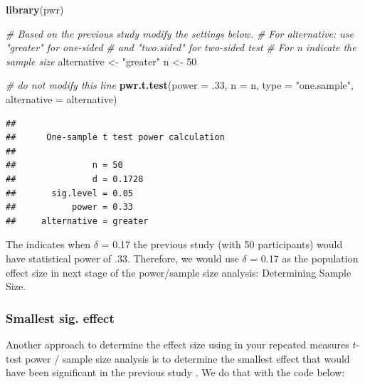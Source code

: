 \documentclass[
]{krantz}
\makeatletter
\newenvironment{Shaded}{\begin{snugshade}}{\end{snugshade}}
\newcommand{\CommentTok}[1]{\textcolor[rgb]{0.37,0.37,0.37}{\textit{#1}}}
\newcommand{\DataTypeTok}[1]{\textcolor[rgb]{0.27,0.27,0.27}{#1}}
\newcommand{\DecValTok}[1]{\textcolor[rgb]{0.06,0.06,0.06}{#1}}
\newcommand{\FloatTok}[1]{\textcolor[rgb]{0.06,0.06,0.06}{#1}}
\newcommand{\KeywordTok}[1]{\textcolor[rgb]{0.27,0.27,0.27}{\textbf{#1}}}
\newcommand{\NormalTok}[1]{#1}
\newcommand{\StringTok}[1]{\textcolor[rgb]{0.5,0.5,0.5}{#1}}
\newenvironment{kframe}{%
\medskip{}
\setlength{\fboxsep}{.8em}
 \def\at@end@of@kframe{}%
 \ifinner\ifhmode%
  \def\at@end@of@kframe{\end{minipage}}%
  \begin{minipage}{\columnwidth}%
 \fi\fi%
 \def\FrameCommand##1{\hskip\@totalleftmargin \hskip-\fboxsep
 \colorbox{shadecolor}{##1}\hskip-\fboxsep
     \hskip-\linewidth \hskip-\@totalleftmargin \hskip\columnwidth}%
 \MakeFramed {\advance\hsize-\width
   \@totalleftmargin\z@ \linewidth\hsize
   \@setminipage}}%
 {\par\unskip\endMakeFramed%
 \at@end@of@kframe}
\renewenvironment{Shaded}{\begin{kframe}}{\end{kframe}}
\makeatother
\begin{document}
\begin{Shaded}
\begin{Highlighting}[]
\KeywordTok{library}\NormalTok{(pwr)}

\CommentTok{# Based on the previous study modify the settings below.}
\CommentTok{# For alternative: use "greater" for one-sided }
\CommentTok{# and "two.sided" for two-sided test}
\CommentTok{# For n indicate the sample size}
\NormalTok{alternative <-}\StringTok{ "greater"}
\NormalTok{n <-}\StringTok{ }\DecValTok{50}

\CommentTok{# do not modify this line}
\KeywordTok{pwr.t.test}\NormalTok{(}\DataTypeTok{power =} \FloatTok{.33}\NormalTok{,}
           \DataTypeTok{n =}\NormalTok{ n, }
           \DataTypeTok{type =} \StringTok{"one.sample"}\NormalTok{,}
           \DataTypeTok{alternative =}\NormalTok{ alternative)}
\end{Highlighting}
\end{Shaded}

\begin{verbatim}
## 
##      One-sample t test power calculation 
## 
##               n = 50
##               d = 0.1728
##       sig.level = 0.05
##           power = 0.33
##     alternative = greater
\end{verbatim}

The indicates when \(\delta\) = 0.17 the previous study (with 50 participants) would have statistical power of .33. Therefore, we would use \(\delta\) = 0.17 as the population effect size in next stage of the power/sample size analysis: Determining Sample Size.

\hypertarget{smallest-sig.-effect-1}{%
\subsubsection{Smallest sig. effect}\label{smallest-sig.-effect-1}}

Another approach to determine the effect size using in your repeated measures \(t\)-test power / sample size analysis is to determine the smallest effect that would have been significant in the previous study \citep{lakens2018equivalence}. We do that with the code below:
\end{document}
